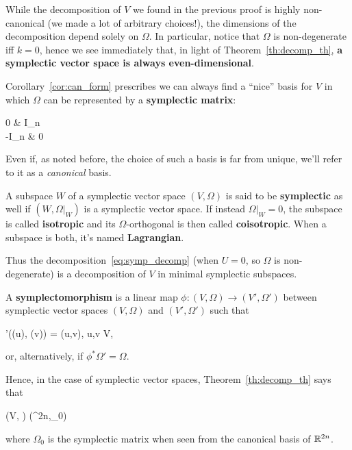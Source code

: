 \documentclass[main.tex]{subfiles}
\begin{document}
\begin{remark}
	While the decomposition of $V$ we found in the previous proof is highly non-canonical (we made a lot of arbitrary choices!), the dimensions of the decomposition depend solely on $\Omega$. In particular, notice that $\Omega$ is non-degenerate iff $k=0$, hence we see immediately that, in light of Theorem~\ref{th:decomp_th}, \textbf{a symplectic vector space is always even-dimensional}.
\end{remark}

Corollary~\ref{cor:can_form} prescribes we can always find a ``nice'' basis for $V$ in which $\Omega$ can be represented by a \textbf{symplectic matrix}:
\begin{eqalign}
	\begin{pmatrix}
		0 & I_n\\
		-I_n & 0
	\end{pmatrix}
\end{eqalign}
Even if, as noted before, the choice of such a basis is far from unique, we'll refer to it as a \emph{canonical} basis.

\begin{definition}
	A subspace $W$ of a symplectic vector space $(V, \Omega)$ is said to be \textbf{symplectic} as well if $(W, \Omega\vert_W)$ is a symplectic vector space. If instead $\Omega\vert_W = 0$, the subspace is called \textbf{isotropic} and its $\Omega$-orthogonal is then called \textbf{coisotropic}. When a subspace is both, it's named \textbf{Lagrangian}.
\end{definition}

Thus the decomposition~\eqref{eq:symp_decomp} (when $U = 0$, so $\Omega$ is non-degenerate) is a decomposition of $V$ in minimal symplectic subspaces.

\begin{definition}
	A \textbf{symplectomorphism} is a linear map $\phi : (V, \Omega) \to (V', \Omega')$ between symplectic vector spaces $(V, \Omega)$ and $(V', \Omega')$ such that
	\begin{eqalign}
		\Omega'(\phi(u), \phi(v)) = \Omega(u,v), \quad \forall u,v \in V,
	\end{eqalign}
	or, alternatively, if $\phi^* \Omega' = \Omega$.
\end{definition}

Hence, in the case of symplectic vector spaces, Theorem~\ref{th:decomp_th} says that
\begin{eqalign}
	(V, \Omega) \iso (\R^{2n},\Omega_0)
\end{eqalign}
where $\Omega_0$ is the symplectic matrix when seen from the canonical basis of $\mathbb{R}^{2n}$.
\end{document}
